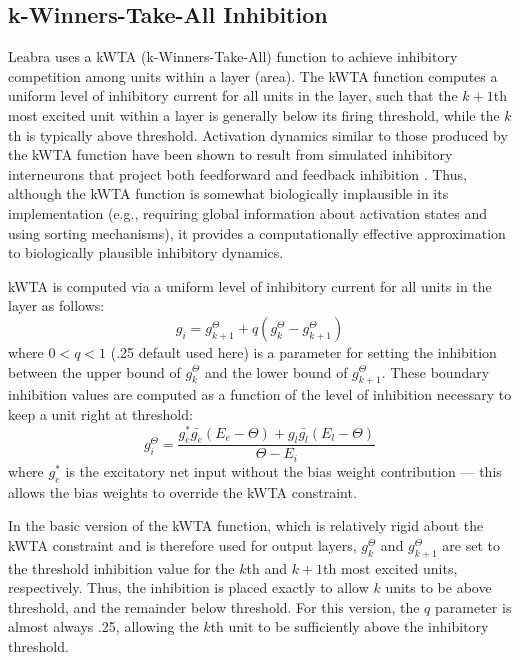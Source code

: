 \subsection{k-Winners-Take-All Inhibition}

Leabra uses a kWTA (k-Winners-Take-All) function to achieve inhibitory competition among units within a layer (area).  The kWTA function computes a uniform level of inhibitory current for all units in the layer, such that the $k+1$th most excited unit within a layer is generally below its firing threshold, while the $k$th is typically above threshold.  Activation dynamics similar to those produced by the kWTA function have been shown to result from simulated inhibitory interneurons that project both feedforward and feedback inhibition \cite{OReillyMunakata00}.  Thus, although the kWTA function is somewhat biologically implausible in its implementation (e.g., requiring global information about activation states and using sorting mechanisms), it provides a computationally effective approximation to biologically plausible inhibitory dynamics.

kWTA is computed via a uniform level of inhibitory current for all units in the layer as follows:
\begin{equation}
  g_i = g^{\Theta}_{k+1} + q (g^{\Theta}_k - g^{\Theta}_{k+1})
  \label{eq.g_i}
\end{equation}
where $0<q<1$ (.25 default used here) is a parameter for setting the inhibition between the upper bound of $g^{\Theta}_k$ and the lower bound of $g^{\Theta}_{k+1}$.  These boundary inhibition values are computed as a function of the level of inhibition necessary to keep a
unit right at threshold:
\begin{equation}
  g_i^{\Theta} = \frac{g^*_e \bar{g_e} (E_e - \Theta) +
    g_l \bar{g_l} (E_l - \Theta)}{\Theta - E_i}
  \label{eq.i_at_thr}
\end{equation}
where $g^*_e$ is the excitatory net input without the bias weight contribution --- this allows the bias weights to override the kWTA constraint.

In the basic version of the kWTA function, which is relatively rigid about the kWTA constraint and is therefore used for output layers, $g^{\Theta}_k$ and $g^{\Theta}_{k+1}$ are set to the threshold inhibition value for the $k$th and $k+1$th most excited units, respectively.  Thus, the inhibition is placed exactly to allow $k$ units to be above threshold, and the remainder below threshold.  For this version, the $q$ parameter is almost always .25, allowing the $k$th unit to be sufficiently above the inhibitory threshold.


